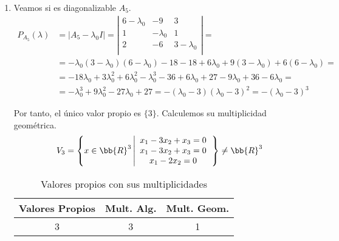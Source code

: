 \begin{ejercicio}
\begin{enumerate}
\begin{enumerate}
            \item Veamos si es diagonalizable $A_5$.\\
            \begin{equation*}\begin{split}
                P_{A_5}(\lambda) & = |A_5-\lambda_0 I| = \left| \begin{array}{ccc}
                6-\lambda_0 & -9 & 3 \\
                1 & -\lambda_0 & 1 \\
                2 & -6 & 3-\lambda_0 \\
                \end{array}\right| =\\
                & = -\lambda_0(3-\lambda_0)(6-\lambda_0)-18-18 +6\lambda_0+9(3-\lambda_0) +6(6-\lambda_0) =\\
                &= -18\lambda_0 +3\lambda_0^2 +6\lambda_0^2-\lambda_0^3 -36 +6\lambda_0+27-9\lambda_0 + 36-6\lambda_0 =\\
                &=-\lambda_0^3+9\lambda_0^2-27\lambda_0+27 = -(\lambda_0-3)(\lambda_0-3)^2 = -(\lambda_0-3)^3
            \end{split}\end{equation*}

            \begin{figure}[H]
                \centering
            \end{figure}

            Por tanto, el único valor propio es $\{3\}$. Calculemos su multiplicidad geométrica.
            \begin{equation*}
            V_3 = \left\{x\in\bb{R}^3 \left| \begin{array}{c}
                 x_1-3x_2+x_3=0  \\
                 x_1-3x_2+x_3=0  \\
                 x_1-2x_2 = 0
            \end{array}\right.\right\} \neq \bb{R}^3
            \end{equation*}

            \begin{table}[H]
                \centering
                \begin{tabular}{c|c|c}
                    Valores Propios & Mult. Alg. & Mult. Geom. \\ \hline 
                    3 & 3 & 1\\
                \end{tabular}
                \caption{Valores propios con sus multiplicidades}
            \end{table}


\end{enumerate}
\end{enumerate}
\end{ejercicio}
